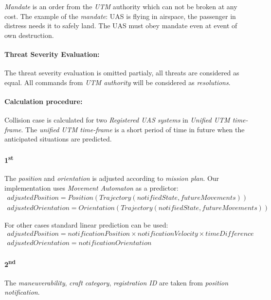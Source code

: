 \emph{Mandate} is an order from the \emph{UTM} authority which can not be broken at any cost. The example of the \emph{mandate}: UAS is flying in airspace, the passenger in distress needs it to safely land. The UAS must obey mandate even at event of own destruction.

\paragraph{Threat Severity Evaluation:} The threat severity evaluation is omitted partialy, all threats are considered as equal. All commands from \emph{UTM authority} will be considered as \emph{resolutions}.

\paragraph{Calculation procedure:} Collision case is calculated for two \emph{Registered UAS systems} in \emph{Unified UTM time-frame}. The \emph{unified UTM time-frame} is a short period of time in future when the anticipated situations are predicted. 

\paragraph{1\textsuperscript{st}} The \emph{position} and \emph{orientation} is adjusted according to \emph{mission plan}. Our implementation uses \emph{Movement Automaton} as a predictor:
\begin{equation}
\begin{gathered}
    adjustedPosition = Position(Trajectory(notifiedState, futureMovements))\\
    adjustedOrientation = Orientation(Trajectory(notifiedState, futureMovements))
\end{gathered}
\end{equation}

\noindent For other cases standard linear prediction can be used:
\begin{equation}
    \begin{gathered}
        adjustedPosition = notificationPosition \times notificationVelocity \times timeDifference\\
        adjustedOrientation = notificationOrientation
    \end{gathered}
\end{equation}

\paragraph{2\textsuperscript{nd}} The \emph{maneuverability}, \emph{craft category}, \emph{registration ID} are taken from \emph{position notification}.

